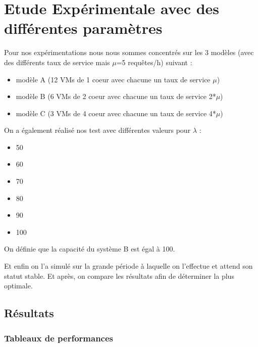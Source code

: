 \section{Etude Exp\'erimentale avec des diff\'erentes paramètres}
\newtheorem{theo}{th\'eor\`eme: }
\newtheorem{defe}{d\'efinition:}
\newtheorem{forule}{}

\noindent Pour nos expérimentations nous nous sommes concentrés sur les 3 modèles (avec des différents taux de service mais $\mu$=5 requêtes/h) suivant : \begin{itemize}
    \item modèle A (12 VMs de 1 coeur avec chacune un taux de service $\mu$) 
    \item modèle B (6 VMs de 2 coeur avec chacune un taux de service 2*$\mu$)
    \item modèle C (3 VMs de 4 coeur avec chacune un taux de service 4*$\mu$) \\
\end{itemize}


\noindent On a  également réalisé nos test avec différentes valeurs pour $\lambda$ : \begin{itemize}
    \item 50
    \item 60
    \item 70
    \item 80 
    \item 90
    \item 100\\
\end{itemize}

\noindent On définie que la capacité du système B est égal à 100.

\noindent Et enfin on l'a simulé sur la grande période à laquelle on l'effectue et attend son statut stable. Et après, on compare les résultats afin de déterminer la plus optimale.

\subsection{Résultats}
\subsubsection{Tableaux de performances}


